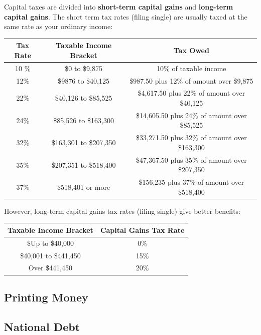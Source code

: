 \documentclass{article}
\begin{document}
    \begin{example}
      Capital taxes are divided into \textbf{short-term capital gains} and \textbf{long-term capital gains}. The short term tax rates (filing single) are usually taxed at the same rate as your ordinary income:
      \begin{center}
      \begin{tabular}{c|c|c}
          Tax Rate & Taxable Income Bracket & Tax Owed \\
          \hline
          10 \% & \$0 to \$9,875 & 10\% of taxable income \\
          12\% & \$9876 to \$40,125 & \$987.50 plus 12\% of amount over \$9,875\\
          22\% & \$40,126 to \$85,525 & \$4,617.50 plus 22\% of amount over \$40,125\\
          24\% & \$85,526 to \$163,300 & \$14,605.50 plus 24\% of amount over \$85,525\\
          32\% & \$163,301 to \$207,350 & \$33,271.50 plus 32\% of amount over \$163,300\\
          35\% & \$207,351 to \$518,400 & \$47,367.50 plus 35\% of amount over \$207,350\\
          37\% & \$518,401 or more & \$156,235 plus 37\% of amount over \$518,400
      \end{tabular}
      \end{center}
      However, long-term capital gains tax rates (filing single) give better benefits: 
      \begin{center}
      \begin{tabular}{c|c}
          Taxable Income Bracket & Capital Gains Tax Rate\\
          \hline
          \$Up to \$40,000 & 0\% \\
          \$40,001 to \$441,450 & 15\% \\
          Over \$441,450 & 20\% 
      \end{tabular}
      \end{center}
    \end{example}

  \subsection{Printing Money}


  \subsection{National Debt}
\end{document}
